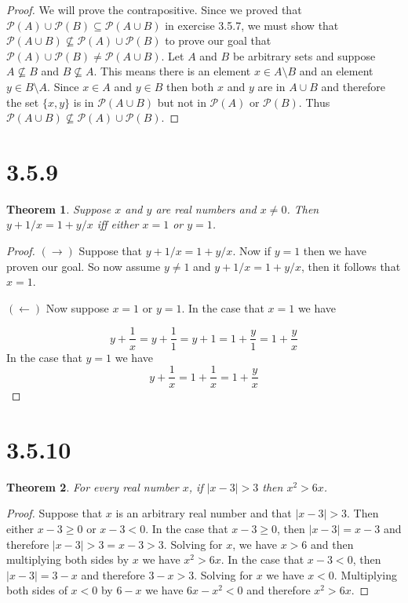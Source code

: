 \documentclass{article}
\newcommand{\pwset}{\mathscr{P}}
\newtheorem*{theorem}{Theorem}  %
\begin{document}
\begin{proof}

We will prove the contrapositive. Since we proved that $\pwset (A) \cup \pwset (B) \subseteq \pwset (A \cup B)$ in exercise 3.5.7, we must show that $\pwset (A \cup B) \not\subseteq \pwset (A) \cup \pwset (B)$ to prove our goal that $\pwset (A) \cup \pwset (B) \neq \pwset (A \cup B)$. Let $A$ and $B$ be arbitrary sets and suppose $A \not\subseteq B$ and $B \not\subseteq A$. This means there is an element $x \in A \setminus B$ and an element $y \in B \setminus A$. Since $x \in A$ and $y \in B$ then both $x$ and $y$ are in $A \cup B$ and therefore the set $\{ x, y \}$ is in $\pwset (A \cup B)$ but not in $\pwset (A)$ or $\pwset (B)$. Thus $\pwset (A \cup B) \not\subseteq \pwset (A) \cup \pwset (B)$.
\end{proof}

\section*{3.5.9}
\begin{theorem} Suppose $x$ and $y$ are real numbers and $x \neq 0$. Then $y + 1/x = 1 + y/x$ iff either $x = 1$ or $y = 1$.
\end{theorem}

\begin{proof}
$(\rightarrow)$ Suppose that $y + 1/x = 1 + y/x$. Now if $y = 1$ then we have proven our goal. So now assume $y \neq 1$ and $y + 1/x = 1 + y/x$, then it follows that $x = 1$.

$(\leftarrow)$ Now suppose $x = 1$ or $y = 1$. In the case that $x = 1$ we have

\begin{equation*}
y + \frac{1}{x} = y + \frac{1}{1} = y + 1 = 1 + \frac{y}{1} = 1 + \frac{y}{x}
\end{equation*}
In the case that $y = 1$ we have
\begin{equation*}
y + \frac{1}{x} = 1 + \frac{1}{x} = 1 + \frac{y}{x}
\end{equation*}
\end{proof}

\section*{3.5.10}
\begin{theorem} For every real number $x$, if $ |x - 3| > 3$ then $x^2 > 6x$.
\end{theorem}

\begin{proof}
Suppose that $x$ is an arbitrary real number and that $ | x - 3 | > 3 $. Then either $x - 3 \geq 0$ or $x - 3 < 0$. In the case that $x - 3 \geq 0$, then $ | x - 3 | = x - 3 $ and therefore $ | x - 3 | > 3 = x - 3 > 3$. Solving for $x$, we have $x > 6$ and then multiplying both sides by $x$ we have $x^2 > 6x$. In the case that $x - 3 < 0$, then $ | x - 3 | = 3 - x $ and therefore $3 - x > 3$. Solving for $x$ we have $x < 0$. Multiplying both sides of $ x < 0 $ by $ 6 - x $ we have $ 6x - x^2 < 0$ and therefore $x^2 > 6x$. 
\end{proof}
\end{document}
